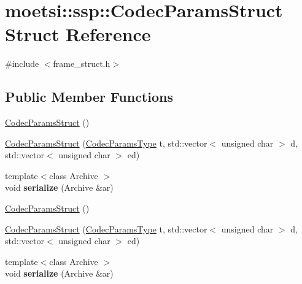 \hypertarget{structmoetsi_1_1ssp_1_1CodecParamsStruct}{}\section{moetsi\+:\+:ssp\+:\+:Codec\+Params\+Struct Struct Reference}
\label{structmoetsi_1_1ssp_1_1CodecParamsStruct}


{\ttfamily \#include $<$frame\+\_\+struct.\+h$>$}

\subsection*{Public Member Functions}
\begin{DoxyCompactItemize}
\item 
\hyperlink{structmoetsi_1_1ssp_1_1CodecParamsStruct_ae2d0f15ae18885a73ac37cf51c78abf4}{Codec\+Params\+Struct} ()
\item 
\hyperlink{structmoetsi_1_1ssp_1_1CodecParamsStruct_a51ed920bba6aef88b4d70bcf9b2647de}{Codec\+Params\+Struct} (\hyperlink{namespacemoetsi_1_1ssp_a6d638ba0bd38e9daded08f633d893563}{Codec\+Params\+Type} t, std\+::vector$<$ unsigned char $>$ d, std\+::vector$<$ unsigned char $>$ ed)
\item 
\mbox{\label{structmoetsi_1_1ssp_1_1CodecParamsStruct_a5cc4146e3f530a895ca13f37165b140a}} 
{\footnotesize template$<$class Archive $>$ }\\void {\bfseries serialize} (Archive \&ar)
\item 
\hyperlink{structmoetsi_1_1ssp_1_1CodecParamsStruct_ae2d0f15ae18885a73ac37cf51c78abf4}{Codec\+Params\+Struct} ()
\item 
\hyperlink{structmoetsi_1_1ssp_1_1CodecParamsStruct_a51ed920bba6aef88b4d70bcf9b2647de}{Codec\+Params\+Struct} (\hyperlink{namespacemoetsi_1_1ssp_a6d638ba0bd38e9daded08f633d893563}{Codec\+Params\+Type} t, std\+::vector$<$ unsigned char $>$ d, std\+::vector$<$ unsigned char $>$ ed)
\item 
\mbox{\label{structmoetsi_1_1ssp_1_1CodecParamsStruct_a5cc4146e3f530a895ca13f37165b140a}} 
{\footnotesize template$<$class Archive $>$ }\\void {\bfseries serialize} (Archive \&ar)
\end{DoxyCompactItemize}

